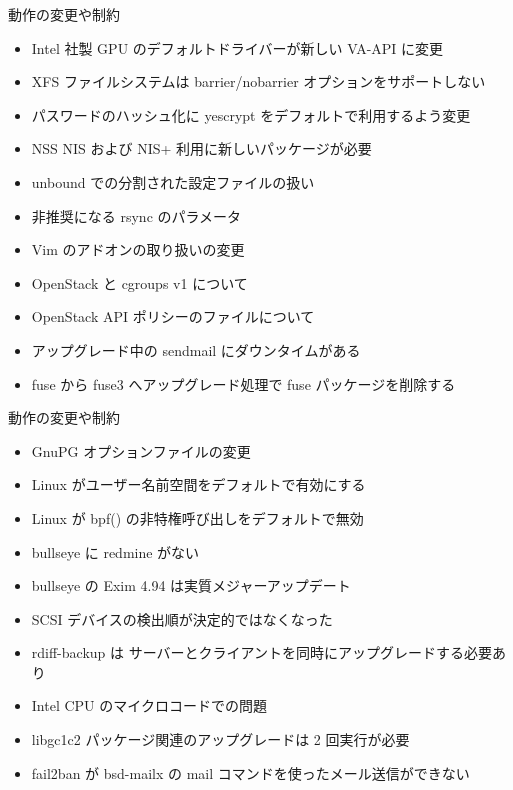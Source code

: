 \begin{frame}{動作の変更や制約}%

\begin{itemize}
\item Intel 社製 GPU のデフォルトドライバーが新しい VA-API に変更
\item XFS ファイルシステムは barrier/nobarrier オプションをサポートしない
\item パスワードのハッシュ化に yescrypt をデフォルトで利用するよう変更
\item NSS NIS および NIS+ 利用に新しいパッケージが必要
\item unbound での分割された設定ファイルの扱い
\item 非推奨になる rsync のパラメータ
\item Vim のアドオンの取り扱いの変更
\item OpenStack と cgroups v1 について
\item OpenStack API ポリシーのファイルについて
\item アップグレード中の sendmail にダウンタイムがある
\item fuse から fuse3 へアップグレード処理で fuse パッケージを削除する
\end{itemize}

\end{frame}


\begin{frame}{動作の変更や制約}%

\begin{itemize}
\item GnuPG オプションファイルの変更
\item Linux がユーザー名前空間をデフォルトで有効にする
\item Linux が bpf() の非特権呼び出しをデフォルトで無効
\item bullseye に redmine がない
\item bullseye の Exim 4.94 は実質メジャーアップデート
\item SCSI デバイスの検出順が決定的ではなくなった
\item rdiff-backup は サーバーとクライアントを同時にアップグレードする必要あり
\item Intel CPU のマイクロコードでの問題
\item libgc1c2 パッケージ関連のアップグレードは 2 回実行が必要
\item fail2ban が bsd-mailx の mail コマンドを使ったメール送信ができない
\end{itemize}

\end{frame}



